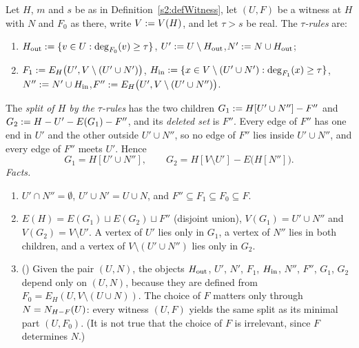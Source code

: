 \begin{definition}\label{s2:defTauRules}
Let $H$, $m$ and $s$ be as in Definition~\ref{s2:defWitness}, let $(U,F)$ be a
witness at $H$ with $N$ and $F_0$ as there, write $V\mathrel{:=} V(H)$, and let
$\tau>s$ be real. The \emph{$\tau$-rules} are:
\begin{enumerate}
\item[(1)] $H_{\mathrm{out}}\mathrel{:=}\{v\in U:\deg_{F_0}(v)\ge\tau\}$,\quad
$U'\mathrel{:=} U\setminus H_{\mathrm{out}}$,\quad $N'\mathrel{:=} N\cup H_{\mathrm{out}}$;
\item[(2)] $F_1\mathrel{:=} E_H\bigl(U',V\setminus(U'\cup N')\bigr)$,\quad
$H_{\mathrm{in}}\mathrel{:=}\{x\in V\setminus(U'\cup N'):\deg_{F_1}(x)\ge\tau\}$,\quad
$N''\mathrel{:=} N'\cup H_{\mathrm{in}}$,\quad $F''\mathrel{:=} E_H\bigl(U',V\setminus(U'\cup
N'')\bigr)$.
\end{enumerate}
The \emph{split of $H$ by the $\tau$-rules} has the two children
$G_1\mathrel{:=} H[U'\cup N'']-F''$ and $G_2\mathrel{:=} H-U'-E(G_1)-F''$, and its
\emph{deleted set} is $F''$. Every edge of $F''$ has one end in $U'$ and the
other outside $U'\cup N''$, so no edge of $F''$ lies inside $U'\cup N''$, and
every edge of $F''$ meets $U'$. Hence
\begin{equation}\label{s2:eqSplit}
G_1=H[U'\cup N''],\qquad G_2=H[V\setminus U']-E\bigl(H[N'']\bigr).
\end{equation}
\emph{Facts.}
\begin{enumerate}
\item[(a)] $U'\cap N''=\emptyset$, $U'\cup N'=U\cup N$, and
$F''\subseteq F_1\subseteq F_0\subseteq F$.
\item[(b)] $E(H)=E(G_1)\sqcup E(G_2)\sqcup F''$ (disjoint union),
$V(G_1)=U'\cup N''$ and $V(G_2)=V\setminus U'$. A vertex of $U'$ lies only in
$G_1$, a vertex of $N''$ lies in both children, and a vertex of
$V\setminus(U'\cup N'')$ lies only in $G_2$.
\item[(c)] () Given the pair $(U,N)$, the objects $H_{\mathrm{out}}$, $U'$, $N'$,
$F_1$, $H_{\mathrm{in}}$, $N''$, $F''$, $G_1$, $G_2$ depend only on $(U,N)$, because
they are defined from $F_0=E_H(U,V\setminus(U\cup N))$. The choice of $F$
matters only through $N=N_{H-F}(U)$: every witness $(U,F)$ yields the
same split as its minimal part $(U,F_0)$. (It is not true that the choice of
$F$ is irrelevant, since $F$ determines $N$.)
\end{enumerate}
\deps{\ref{s2:defWitness}}
\end{definition}

